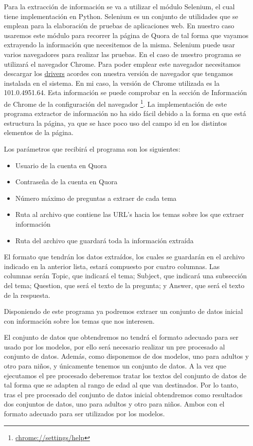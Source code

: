 Para la extracción de información se va a utilizar el módulo Selenium, el cual tiene implementación en Python. Selenium es un conjunto de utilidades que se emplean para la elaboración de pruebas de aplicaciones web. En nuestro caso usaremos este módulo para recorrer la página de Quora de tal forma que vayamos extrayendo la información que necesitemos de la misma. Selenium puede usar varios navegadores para realizar las pruebas. En el caso de nuestro programa se utilizará el navegador Chrome. Para poder emplear este navegador necesitamos descargar los \href{https://sites.google.com/chromium.org/driver/downloads?authuser=0}{drivers} acordes con nuestra versión de navegador que tengamos instalada en el sistema. En mi caso, la versión de Chrome utilizada es la 101.0.4951.64. Esta información se puede comprobar en la sección de Información de Chrome de la configuración del navegador \footnote{\url{chrome://settings/help}}. La implementación de este programa extractor de información no ha sido fácil debido a la forma en que está estructura la página, ya que se hace poco uso del campo id en los distintos elementos de la página.

Los parámetros que recibirá el programa son los siguientes:

\begin{itemize}
\item Usuario de la cuenta en Quora
\item Contraseña de la cuenta en Quora
\item Número máximo de preguntas a extraer de cada tema
\item Ruta al archivo que contiene las URL's hacia los temas sobre los que extraer información
\item Ruta del archivo que guardará toda la información extraída
\end{itemize}

El formato que tendrán los datos extraídos, los cuales se guardarán en el archivo indicado en la anterior lista, estará compuesto por cuatro columnas. Las columnas serán Topic, que indicará el tema; Subject, que indicará una subsección del tema; Question, que será el texto de la pregunta; y Answer, que será el texto de la respuesta.

Disponiendo de este programa ya podremos extraer un conjunto de datos inicial con información sobre los temas que nos interesen.

El conjunto de datos que obtendremos no tendrá el formato adecuado para ser usado por los modelos, por ello será necesario realizar un pre procesado al conjunto de datos. Además, como disponemos de dos modelos, uno para adultos y otro para niños, y únicamente tenemos un conjunto de datos. A la vez que ejecutamos el pre procesado deberemos tratar los textos del conjunto de datos de tal forma que se adapten al rango de edad al que van destinados. Por lo tanto, tras el pre procesado del conjunto de datos inicial obtendremos como resultados dos conjuntos de datos, uno para adultos y otro para niños. Ambos con el formato adecuado para ser utilizados por los modelos.

